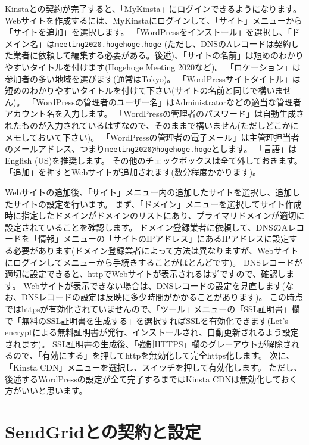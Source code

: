 \documentclass[titlepage,10pt,a4paper,uplatex]{jsbook}
\begin{document}
Kinstaとの契約が完了すると、「\href{https://my.kinsta.com/login/?lang=jp}{MyKinsta}」にログインできるようになります。
Webサイトを作成するには、MyKinstaにログインして、「サイト」メニューから「サイトを追加」を選択します。
「WordPressをインストール」を選択し、「ドメイン名」は\texttt{meeting2020.hogehoge.hoge} (ただし、DNSのAレコードは契約した業者に依頼して編集する必要がある。後述)、「サイトの名前」は短めのわかりやすいタイトルを付けます(Hogehoge Meeting 2020など)。
「ロケーション」は参加者の多い地域を選びます(通常はTokyo)。
「WordPressサイトタイトル」は短めのわかりやすいタイトルを付けて下さい(サイトの名前と同じで構いません)。
「WordPressの管理者のユーザー名」はAdministratorなどの適当な管理者アカウント名を入力します。
「WordPressの管理者のパスワード」は自動生成されたものが入力されているはずなので、そのままで構いません(ただしどこかにメモしておいて下さい)。
「WordPressの管理者の電子メール」は主管理担当者のメールアドレス、つまり\texttt{meeting2020@hogehoge.hoge}とします。
「言語」はEnglish (US)を推奨します。
その他のチェックボックスは全て外しておきます。
「追加」を押すとWebサイトが追加されます(数分程度かかります)。

Webサイトの追加後、「サイト」メニュー内の追加したサイトを選択し、追加したサイトの設定を行います。
まず、「ドメイン」メニューを選択してサイト作成時に指定したドメインがドメインのリストにあり、プライマリドメインが適切に設定されていることを確認します。
ドメイン登録業者に依頼して、DNSのAレコードを「情報」メニューの「サイトのIPアドレス」にあるIPアドレスに設定する必要があります(ドメイン登録業者によって方法は異なりますが、Webサイトにログインしてメニューから手続きすることがほとんどです)。
DNSレコードが適切に設定できると、httpでWebサイトが表示されるはずですので、確認します。
Webサイトが表示できない場合は、DNSレコードの設定を見直します(なお、DNSレコードの設定は反映に多少時間がかかることがあります)。
この時点ではhttpsが有効化されていませんので、「ツール」メニューの「SSL証明書」欄で「無料のSSL証明書を生成する」を選択すればSSLを有効化できます(Let's encryptによる無料証明書が発行、インストールされ、自動更新されるよう設定されます)。
SSL証明書の生成後、「強制HTTPS」欄のグレーアウトが解除されるので、「有効にする」を押してhttpを無効化して完全https化します。
次に、「Kinsta CDN」メニューを選択し、スイッチを押して有効化します。
ただし、後述するWordPressの設定が全て完了するまではKinsta CDNは無効化しておく方がいいと思います。

\section{SendGridとの契約と設定}
\end{document}
